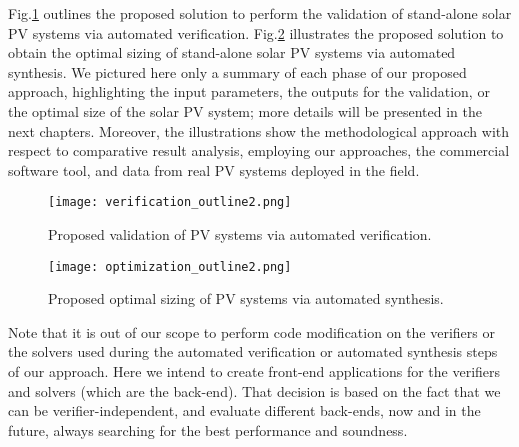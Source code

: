 Fig.\ref{fig:validation_outline} outlines the proposed solution to perform the validation of stand-alone solar PV systems via automated verification. Fig.\ref{fig:optimization_outline} illustrates the proposed solution to obtain the optimal sizing of stand-alone solar PV systems via automated synthesis. We pictured here only a summary of each phase of our proposed approach, highlighting the input parameters, the outputs for the validation, or the optimal size of the solar PV system; more details will be presented in the next chapters. Moreover, the illustrations show the methodological approach with respect to comparative result analysis, employing our approaches, the commercial software tool, and data from real PV systems deployed in the field.

\begin{figure}[h]
\texttt{[image: verification\_outline2.png]}
\centering
\caption{Proposed validation of PV systems via automated verification.}
\label{fig:validation_outline} 
\end{figure}


\begin{figure}[h]
\texttt{[image: optimization\_outline2.png]}
\centering
\caption{Proposed optimal sizing of PV systems via automated synthesis.}
\label{fig:optimization_outline} 
\end{figure}

Note that it is out of our scope to perform code modification on the verifiers or the solvers used during the automated verification or automated synthesis steps of our approach. Here we intend to create front-end applications for the verifiers and solvers (which are the back-end). That decision is based on the fact that we can be verifier-independent, and evaluate different back-ends, now and in the future, always searching for the best performance and soundness.


